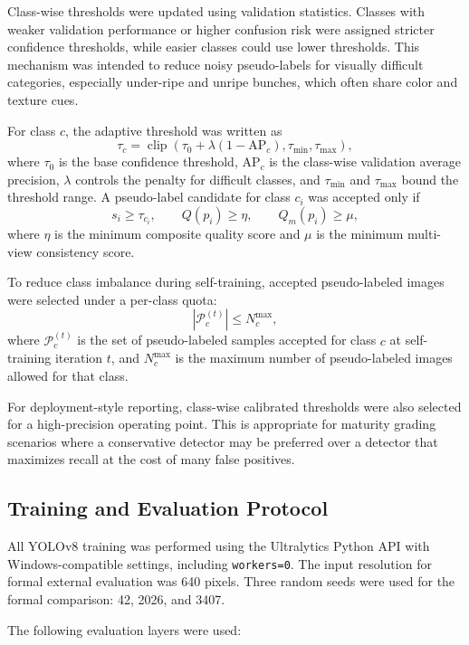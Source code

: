 ﻿\documentclass[12pt]{article}
\begin{document}
Class-wise thresholds were updated using validation statistics. Classes with weaker validation performance or higher confusion risk were assigned stricter confidence thresholds, while easier classes could use lower thresholds. This mechanism was intended to reduce noisy pseudo-labels for visually difficult categories, especially under-ripe and unripe bunches, which often share color and texture cues.

For class \(c\), the adaptive threshold was written as
\[
\tau_c=\operatorname{clip}\left(\tau_0+\lambda(1-\mathrm{AP}_c),\tau_{\min},\tau_{\max}\right),
\]
where \(\tau_0\) is the base confidence threshold, \(\mathrm{AP}_c\) is the class-wise validation average precision, \(\lambda\) controls the penalty for difficult classes, and \(\tau_{\min}\) and \(\tau_{\max}\) bound the threshold range. A pseudo-label candidate for class \(c_i\) was accepted only if
\[
s_i\ge \tau_{c_i}, \qquad Q(p_i)\ge \eta, \qquad Q_m(p_i)\ge \mu,
\]
where \(\eta\) is the minimum composite quality score and \(\mu\) is the minimum multi-view consistency score.

To reduce class imbalance during self-training, accepted pseudo-labeled images were selected under a per-class quota:
\[
|\mathcal{P}^{(t)}_c|\le N_c^{\max},
\]
where \(\mathcal{P}^{(t)}_c\) is the set of pseudo-labeled samples accepted for class \(c\) at self-training iteration \(t\), and \(N_c^{\max}\) is the maximum number of pseudo-labeled images allowed for that class.

For deployment-style reporting, class-wise calibrated thresholds were also selected for a high-precision operating point. This is appropriate for maturity grading scenarios where a conservative detector may be preferred over a detector that maximizes recall at the cost of many false positives.

\subsection{Training and Evaluation Protocol}

All YOLOv8 training was performed using the Ultralytics Python API with Windows-compatible settings, including \texttt{workers=0}. The input resolution for formal external evaluation was 640 pixels. Three random seeds were used for the formal comparison: 42, 2026, and 3407.

The following evaluation layers were used:
\end{document}
